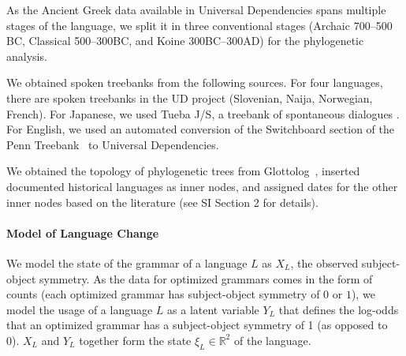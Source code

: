 \documentclass[11pt,a4paper]{article}
\begin{document}
As the Ancient Greek data available in Universal Dependencies spans multiple stages of the language, we split it in three conventional stages (Archaic 700--500 BC, Classical 500--300BC, and Koine 300BC--300AD) for the phylogenetic analysis. 

We obtained spoken treebanks from the following sources.
For four languages, there are spoken treebanks in the UD project (Slovenian, Naija, Norwegian, French). For Japanese, we used Tueba J/S, a treebank of spontaneous dialogues \citep{hall2006conll}. For English, we used an automated conversion \citep{schuster2018sentences} of the Switchboard section of the Penn Treebank~\citep{marcus-building-1993} to Universal Dependencies.

We obtained the topology of phylogenetic trees from Glottolog~\citep{nordhoff2011glottolog}, inserted documented historical languages as inner nodes, and assigned dates for the other inner nodes based on the literature (see SI Section 2 for details).




\paragraph{Model of Language Change}



We model the state of the grammar of a language $L$ as $X_L$, the observed subject-object symmetry.
As the data for optimized grammars comes in the form of counts (each optimized grammar has subject-object symmetry of $0$ or $1$), we model the usage of a language $L$ as a latent variable $Y_L$ that defines the log-odds that an optimized grammar has a subject-object symmetry of 1 (as opposed to 0).
$X_L$ and $Y_L$ together form the state $\xi_L \in \mathbb{R}^2$  of the language.

\end{document}
